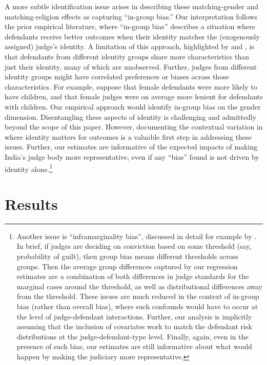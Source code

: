 \documentclass[12pt,english]{article}
\begin{document}
A more subtle identification issue arises in describing these matching-gender and matching-religion effects as capturing ``in-group bias.'' Our interpretation follows the prior empirical literature, where ``in-group bias'' describes a situation where defendants receive better outcomes when their identity matches the (exogenously assigned) judge's identity. A limitation of this approach, highlighted by \citet{frandsen2019judging} and \citet{canay2020use}, is that defendants from different identity groups share more characteristics than just their identity, many of which are unobserved. Further, judges from different identity groups might have correlated preferences or biases across those characteristics. For example, suppose that female defendants were more likely to have children, and that female judges were on average more lenient for defendants with children. Our empirical approach would identify in-group bias on the gender dimension. Disentangling these aspects of identity is challenging and admittedly beyond the scope of this paper. However, documenting the contextual variation in where identity matters for outcomes is a valuable first step in addressing these issues. Further, our estimates are informative of the expected impacts of making India's judge body more representative, even if any ``bias'' found is not driven by identity alone.\footnote{Another issue is ``inframarginality bias'', discussed in detail for example by \citet{canay2020use}. In brief, if judges are deciding on conviction based on some threshold (say, probability of guilt), then group bias means different thresholds across groups. Then the average group differences captured by our regression estimates are a combination of both differences in judge standards for the marginal cases around the threshold, as well as distributional differences away from the threshold. These issues are much reduced in the context of in-group bias (rather than overall bias), where such confounds would have to occur at the level of judge-defendant interactions. Further, our analysis is implicitly assuming that the inclusion of covariates work to match the defendant risk distributions at the judge-defendant-type level. Finally, again, even in the presence of such bias, our estimates are still informative about what would happen by making the judiciary more representative.}

\section{Results}
\label{sec:results}
\end{document}
